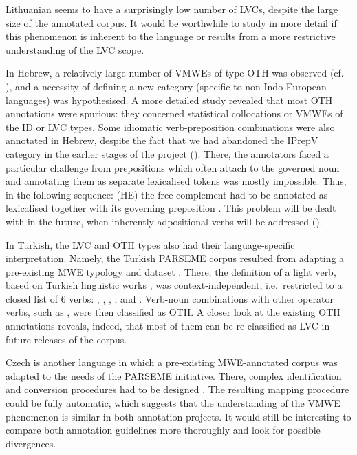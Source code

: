 \documentclass[output=paper,
modfonts,
]{langscibook}
\begin{document}
Lithuanian seems to have a surprisingly low number of LVCs, despite the large size of the annotated corpus. It would be worthwhile to study in more detail if this phenomenon is inherent to the language or results from a more restrictive understanding of the LVC scope.

In Hebrew, a relatively large number of VMWEs of type OTH was observed (cf. ), and a necessity of defining a new category (specific to non-Indo-European languages) was hypothesised. A more detailed study revealed that most OTH annotations were spurious: they concerned statistical collocations or VMWEs of the ID or LVC types. Some idiomatic verb-preposition combinations were also annotated in Hebrew, despite the fact that we had abandoned the IPrepV category in the earlier stages of the project (). There, the annotators faced a particular challenge from prepositions which often attach to the governed noun and annotating them as separate lexicalised tokens was mostly impossible. Thus, in the following sequence: 
(HE) %
 the free complement %
 had to be annotated as lexicalised together with its governing preposition %
. This problem will be dealt with in the future, when inherently adpositional verbs will be addressed ().

In Turkish, the LVC and OTH types also had their language-specific interpretation. Namely, the Turkish PARSEME corpus resulted from adapting a pre-existing MWE typology and dataset \citep{ciclingkubra}. There, the definition of a light verb, based on Turkish linguistic works \citep{siemieniec2010some}, was context-independent, i.e.\ restricted to a closed list of 6 verbs: , , , ,  and . Verb-noun combinations with other operator verbs, such as , were then classified as OTH. A closer look at the existing OTH annotations reveals, indeed, that most of them can be re-classified as LVC in future releases of the corpus.

Czech is another language in which a pre-existing MWE-annotated corpus \citep{pdt2017} was adapted to the needs of the PARSEME initiative. There, complex identification and conversion procedures had to be designed \citep{biblio:BeHaExtractingVerbal2017}. 
The resulting mapping procedure could be fully automatic, which suggests that the understanding of the VMWE phenomenon is similar in both annotation projects. It would still be interesting to compare both annotation guidelines more thoroughly and look for possible divergences.
\end{document}
